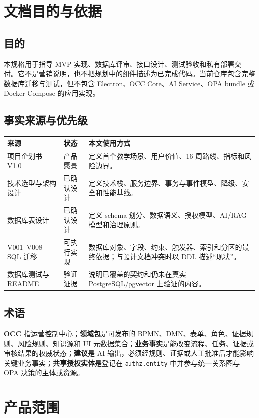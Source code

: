 \documentclass[journal,a4paper,onecolumn]{IEEEtran}
\begin{document}
\section{文档目的与依据}
\subsection{目的}
本规格用于指导 MVP 实现、数据库评审、接口设计、测试验收和私有部署交付。它不是营销说明，也不把规划中的组件描述为已完成代码。当前仓库包含完整数据库迁移与测试，但不包含 Electron、OCC Core、AI Service、OPA bundle 或 Docker Compose 的应用实现。

\subsection{事实来源与优先级}
\begin{longtable}{p{}p{}p{}}
\toprule
来源 & 状态 & 本文使用方式 \\
\midrule
\endhead
项目企划书 V1.0 & 产品愿景 & 定义首个教学场景、用户价值、16 周路线、指标和风险边界。\\
技术选型与架构设计 & 已确认设计 & 定义技术栈、服务边界、事务与事件模型、降级、安全和性能基线。\\
数据库表设计 & 已确认设计 & 定义 schema 划分、数据语义、授权模型、AI/RAG 模型和治理原则。\\
V001--V008 SQL 迁移 & 可执行实现 & 数据库对象、字段、约束、触发器、索引和分区的最终依据；与设计文档冲突时以 DDL 描述“现状”。\\
数据库测试与 README & 验证证据 & 说明已覆盖的契约和仍未在真实 PostgreSQL/pgvector 上验证的内容。\\
\bottomrule
\end{longtable}

\subsection{术语}
\textbf{OCC} 指运营控制中心；\textbf{领域包}是可发布的 BPMN、DMN、表单、角色、证据规则、风险规则、知识源和 UI 元数据集合；\textbf{业务事实}是能改变流程、任务、证据或审核结果的权威状态；\textbf{建议}是 AI 输出，必须经规则、证据或人工批准后才能影响关键业务事实；\textbf{共享授权实体}是登记在 \texttt{authz.entity} 中并参与统一关系图与 OPA 决策的主体或资源。

\section{产品范围}
\end{document}
